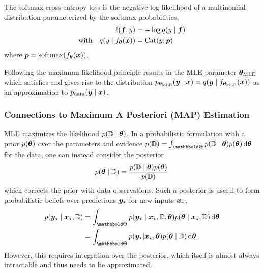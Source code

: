 \begin{example}\label{ex:background::probabilisticInterpretationCrossEntropyLoss}
  The softmax cross-entropy loss 
  is the negative log-likelihood of a multinomial distribution parameterized by
  the softmax probabilities,
  \begin{align*}
    \ell({\bm{f}}, y) &= -\log q(y\;|\;{\bm{f}})
    \\
    \text{with}\quad
    q(y\;|\;f_{{\bm{\theta}}}({\bm{x}})) &= \operatorname{Cat}(y; {\bm{p}})
  \end{align*}
  where%
  ${\bm{p}} = \mathrm{softmax}(f_{{\bm{\theta}}}({\bm{x}}))$.
\end{example}

Following the maximum likelihood principle results in the MLE parameter
${\bm{\theta}}_{\text{MLE}}$ which satisfies
 and gives rise to
the distribution $p_{{\bm{\theta}}_{\text{MLE}}}({\bm{y}}\;|\;{\bm{x}}) =
q({\bm{y}}\;|\;f_{{\bm{\theta}}_{\text{MLE}}}({\bm{x}}))$ as an approximation to $p_{\mathrm{data}}({\bm{y}}\;|\;{\bm{x}})$.

\subsubsection{Connections to Maximum A Posteriori (MAP) Estimation}
MLE maximizes the likelihood $ p({\mathbb{D}}\;|\;{\bm{\theta}})$. In a probabilistic
formulation with a prior $p({\bm{\theta}})$ over the parameters and evidence $p(\sD) =
\int_{\sTheta} p(\giventhat{\sD}{\vtheta}) p(\vtheta)\,\diff \vtheta$ for the
data, one can instead consider the posterior
\begin{align}
  \label{eq:background::BayesRule}
  p({\bm{\theta}}\;|\;{\mathbb{D}})
  =
  \frac{
  p({\mathbb{D}}\;|\;{\bm{\theta}}) p({\bm{\theta}})
  }{
  p({\mathbb{D}})
  }\,
\end{align}
which corrects the prior with data observations. Such a posterior is useful to
form probabilistic beliefs over predictions ${\bm{y}}_{\star}$ for new inputs
${\bm{x}}_{\star}$,
\begin{align}
  \label{eq:background::BayesianPrediction}
  \begin{split}
    p(\giventhat{\vy_{\star}}{\vx_{\star}, \sD})
    &=
      \int_{\sTheta} p(\giventhat{\vy_{\star}}{\vx_{\star}, \sD, \vtheta})
      p(\giventhat{\vtheta}{\vx_{\star}, \sD})\,\diff \vtheta
    \\
    &=
      \int_{\sTheta} p(\vy_{\star} | \vx_{\star}, \vtheta)
      p(\giventhat{\vtheta}{\sD})\,\diff \vtheta\,.
  \end{split}
\end{align}
However, this requires integration over the posterior, which itself is almost
always intractable and thus needs to be approximated.

